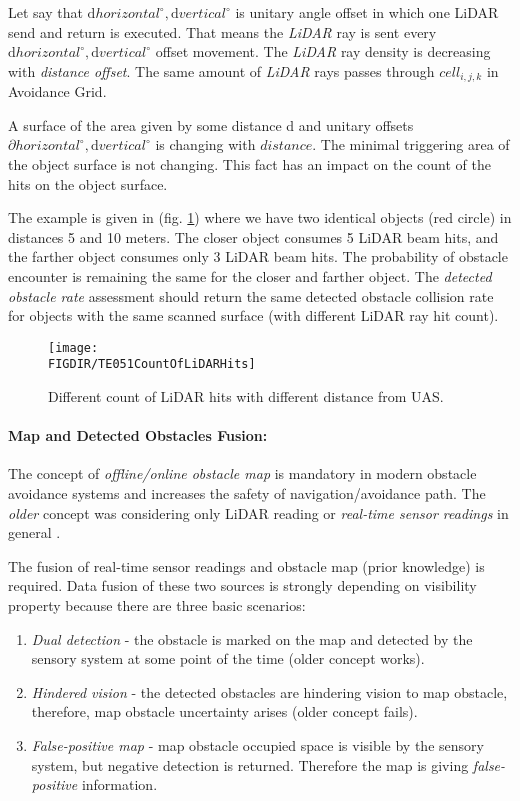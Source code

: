 Let say that $\text{d} horizontal^\circ, \text{d} vertical^\circ$ is unitary angle offset in which one LiDAR send and return is executed. That means the \emph{LiDAR} ray is sent every $\text{d} horizontal^\circ, \text{d} vertical^\circ$ offset movement. The \emph{LiDAR} ray density is decreasing with \emph{distance offset}. The same amount of \emph{LiDAR} rays passes through $cell_{i,j,k}$ in Avoidance Grid.

A surface of the area given by some distance d and unitary offsets$\partial horizontal^\circ, \text{d} vertical^\circ$  is changing with $distance$. The minimal triggering area of the object surface is not changing. This fact has an impact on the count of the hits on the object surface. 

The example is given in (fig. \ref{fig:P01CountOfLiDARHits}) where we have two identical objects (red circle) in distances 5 and 10 meters. The closer object consumes 5 LiDAR beam hits, and the farther object consumes only 3 LiDAR beam hits. The probability of obstacle encounter is remaining the same for the closer and farther object. The \emph{detected obstacle rate} assessment should return the same  detected obstacle collision rate for objects with the same scanned surface (with different LiDAR ray hit count).

\begin{figure}[H]
    \centering
    \texttt{[image: \\FIGDIR/TE051CountOfLiDARHits]}
    \caption{Different count of LiDAR hits with different distance from UAS.}
    \label{fig:P01CountOfLiDARHits}
\end{figure}


\paragraph{Map and Detected Obstacles Fusion:} The concept of \emph{offline/online obstacle map} is mandatory in modern obstacle avoidance systems and increases the safety of navigation/avoidance path. The \emph{older} concept was considering only LiDAR reading or \emph{real-time sensor readings} in general \cite{gomola2017probabilistic}. 

The fusion of real-time sensor readings and obstacle map (prior knowledge) is required. Data fusion of these two sources is strongly depending on visibility property because there are three basic scenarios:

\begin{enumerate}
    \item \emph{Dual detection} - the obstacle is marked on the map and detected by the sensory system at some point of the time (older concept works).
    
    \item \emph{Hindered vision} - the detected obstacles are hindering vision to map obstacle, therefore, map obstacle uncertainty arises (older concept fails). 
    
    \item \emph{False-positive map} - map obstacle occupied space is visible by the sensory system, but negative detection is returned. Therefore the map is giving \emph{false-positive} information.
\end{enumerate}

